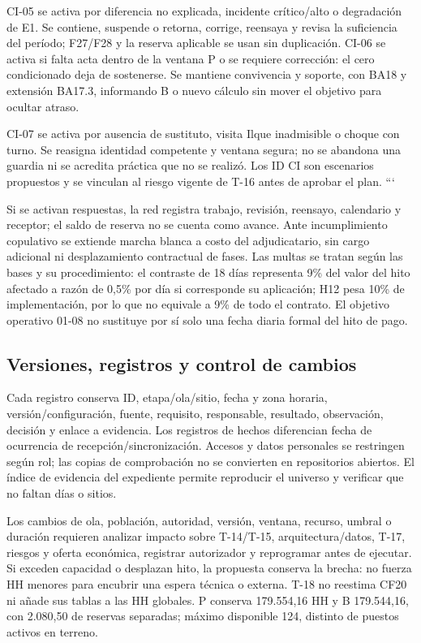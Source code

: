CI-05 se activa por diferencia no explicada, incidente crítico/alto o degradación de E1. Se contiene, suspende o retorna, corrige, reensaya y revisa la suficiencia del período; F27/F28 y la reserva aplicable se usan sin duplicación. CI-06 se activa si falta acta dentro de la ventana P o se requiere corrección: el cero condicionado deja de sostenerse. Se mantiene convivencia y soporte, con BA18 y extensión BA17.3, informando B o nuevo cálculo sin mover el objetivo para ocultar atraso.

CI-07 se activa por ausencia de sustituto, visita Ilque inadmisible o choque con turno. Se reasigna identidad competente y ventana segura; no se abandona una guardia ni se acredita práctica que no se realizó. Los ID CI son escenarios propuestos y se vinculan al riesgo vigente de T-16 antes de aprobar el plan.
```


Si se activan respuestas, la red registra trabajo, revisión, reensayo, calendario y receptor; el saldo de reserva no se cuenta como avance. Ante incumplimiento copulativo se extiende marcha blanca a costo del adjudicatario, sin cargo adicional ni desplazamiento contractual de fases. Las multas se tratan según las bases y su procedimiento: el contraste de 18 días representa 9\% del valor del hito afectado a razón de 0,5\% por día si corresponde su aplicación; H12 pesa 10\% de implementación, por lo que no equivale a 9\% de todo el contrato. El objetivo operativo 01-08 no sustituye por sí solo una fecha diaria formal del hito de pago.

\subsection{Versiones, registros y control de cambios}
Cada registro conserva ID, etapa/ola/sitio, fecha y zona horaria, versión/configuración, fuente, requisito, responsable, resultado, observación, decisión y enlace a evidencia. Los registros de hechos diferencian fecha de ocurrencia de recepción/sincronización. Accesos y datos personales se restringen según rol; las copias de comprobación no se convierten en repositorios abiertos. El índice de evidencia del expediente permite reproducir el universo y verificar que no faltan días o sitios.

Los cambios de ola, población, autoridad, versión, ventana, recurso, umbral o duración requieren analizar impacto sobre T-14/T-15, arquitectura/datos, T-17, riesgos y oferta económica, registrar autorizador y reprogramar antes de ejecutar. Si exceden capacidad o desplazan hito, la propuesta conserva la brecha: no fuerza HH menores para encubrir una espera técnica o externa. T-18 no reestima CF20 ni añade sus tablas a las HH globales. P conserva 179.554,16 HH y B 179.544,16, con 2.080,50 de reservas separadas; máximo disponible 124, distinto de puestos activos en terreno.

